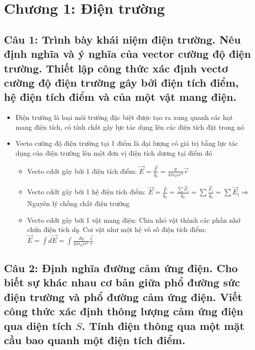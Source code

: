 \section[Chương 1]{Chương 1: Điện trường}

\subsection[Câu 1]{Câu 1: Trình bày khái niệm điện trường. Nêu định nghĩa và ý nghĩa của vector cường độ điện trường. Thiết lập công thức xác định vectơ cường độ điện trường gây bởi điện tích điểm, hệ điện tích điểm và của một vật mang điện.}

\begin{itemize}
  \item Điện trường là loại môi trường đặc biệt được tạo ra xung quanh các hạt mang điện tích, có tính chất gây lực tác dụng lên các điện tích đặt trong nó
  \item Vecto cường độ điện trường tại 1 điểm là đại lượng có giá trị bằng lực tác dụng của điện trường lên một đơn vị điện tích dương tại điểm đó
  \begin{itemize}
    \item Vecto cddt gây bởi 1 điện tích điểm: $\vec{E} = \frac{\vec{F}}{q_0} = \frac{q}{4\pi\epsilon_0\epsilon r^3} \vec{r}$
    \item Vecto cddt gây bởi 1 hệ điện tích điểm: $\vec{E} = \frac{\vec{F}}{q_0} = \frac{\sum\limits \vec{F}_i}{q_0} = \sum\limits \frac{\vec{F}_i}{q_0} = \sum\limits \vec{E}_i \Rightarrow$ Nguyên lý chồng chất điện trường
    \item Vecto cddt gây bởi 1 vật mang điện: Chia nhỏ vật thành các phần nhở chứa điện tích $dq$. Coi vật như một hệ vô số điện tích điểm: $\vec{E} = \int d\vec{E} = \int \frac{dq}{4\pi\epsilon_0\epsilon r^2} \frac{\vec{r}}{r}$
  \end{itemize}
\end{itemize}

\subsection[Câu 2]{Câu 2: Định nghĩa đường cảm ứng điện. Cho biết sự khác nhau cơ bản giữa phổ đường sức điện trường và phổ đường cảm ứng điện. Viết công thức xác định thông lượng cảm ứng điện qua diện tích $S$. Tính điện thông qua một mặt cầu bao quanh một điện tích điểm.} 

